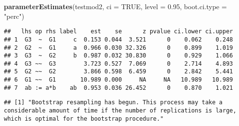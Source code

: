 \documentclass[
]{article}
\newenvironment{Shaded}{\begin{snugshade}}{\end{snugshade}}
\newcommand{\DataTypeTok}[1]{\textcolor[rgb]{0.13,0.29,0.53}{#1}}
\newcommand{\DecValTok}[1]{\textcolor[rgb]{0.00,0.00,0.81}{#1}}
\newcommand{\FloatTok}[1]{\textcolor[rgb]{0.00,0.00,0.81}{#1}}
\newcommand{\KeywordTok}[1]{\textcolor[rgb]{0.13,0.29,0.53}{\textbf{#1}}}
\newcommand{\NormalTok}[1]{#1}
\newcommand{\OperatorTok}[1]{\textcolor[rgb]{0.81,0.36,0.00}{\textbf{#1}}}
\newcommand{\OtherTok}[1]{\textcolor[rgb]{0.56,0.35,0.01}{#1}}
\newcommand{\StringTok}[1]{\textcolor[rgb]{0.31,0.60,0.02}{#1}}
\begin{document}
\begin{Shaded}
\begin{Highlighting}[]
\KeywordTok{parameterEstimates}\NormalTok{(testmod2, }\DataTypeTok{ci =} \OtherTok{TRUE}\NormalTok{, }\DataTypeTok{level =} \FloatTok{0.95}\NormalTok{, }\DataTypeTok{boot.ci.type =} \StringTok{"perc"}\NormalTok{)}
\end{Highlighting}
\end{Shaded}

\begin{verbatim}
##   lhs op rhs label    est    se      z pvalue ci.lower ci.upper
## 1  G3  ~  G1     c  0.153 0.044  3.521      0    0.062    0.248
## 2  G2  ~  G1     a  0.966 0.030 32.326      0    0.899    1.019
## 3  G3  ~  G2     b  0.987 0.032 30.830      0    0.929    1.066
## 4  G3 ~~  G3        3.723 0.527  7.069      0    2.714    4.893
## 5  G2 ~~  G2        3.866 0.598  6.459      0    2.842    5.441
## 6  G1 ~~  G1       10.989 0.000     NA     NA   10.989   10.989
## 7  ab := a*b    ab  0.953 0.036 26.452      0    0.870    1.021
\end{verbatim}

\begin{Shaded}
\end{Shaded}

\begin{verbatim}
## [1] "Bootstrap resampling has begun. This process may take a considerable amount of time if the number of replications is large, which is optimal for the bootstrap procedure."
\end{verbatim}
\end{document}
